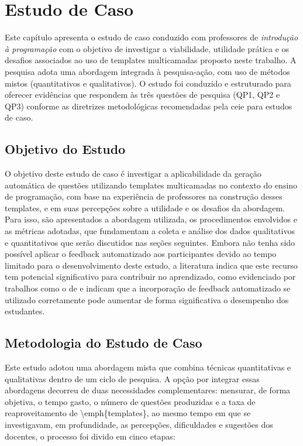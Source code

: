 \chapter{Estudo de Caso}

Este capítulo apresenta o estudo de caso conduzido com professores de \textit{introdução à programação} com o objetivo de investigar a viabilidade, utilidade prática e os desafios associados ao uso de templates multicamadas proposto neste trabalho. A pesquisa adota uma abordagem integrada à pesquisa-ação, com uso de métodos mistos (quantitativos e qualitativos). O estudo foi conduzido e estruturado para oferecer evidências que respondem às três questões de pesquisa (QP1, QP2 e QP3) conforme as diretrizes metodológicas recomendadas pela \gls{ceie} para estudos de caso.

\section{Objetivo do Estudo}
O objetivo deste estudo de caso é investigar a aplicabilidade da geração automática de questões utilizando templates multicamadas no contexto do ensino de programação, com base na experiência de professores na construção desses templates, e em suas percepções sobre a utilidade e os desafios da abordagem. Para isso, são apresentados a abordagem utilizada,  os procedimentos envolvidos e as métricas adotadas, que fundamentam a coleta e análise dos dados qualitativos e quantitativos que serão discutidos nas seções seguintes.
Embora não tenha sido possível aplicar o feedback automatizado aos participantes devido ao tempo limitado para o desenvolvimento deste estudo, a literatura  indica que este recurso tem potencial significativo para contribuir no aprendizado, como evidenciado por trabalhos como o de \parencite{vanpraet2024} e \parencite{fung2024} indicam que a incorporação de feedback automatizado se utilizado corretamente pode aumentar de forma significativa o desempenho dos estudantes.

\section{Metodologia do Estudo de Caso}

Este estudo adotou uma abordagem mista que combina técnicas quantitativas e qualitativas dentro de um ciclo de pesquisa. A opção por integrar essas abordagens decorreu de duas necessidades complementares: mensurar, de forma objetiva, o tempo gasto, o número de questões produzidas e a taxa de reaproveitamento de \textbackslash{}emph\{templates\}, ao mesmo tempo em que se investigavam, em profundidade, as percepções, dificuldades e sugestões dos docentes, o processo foi divido em cinco etapas:  

